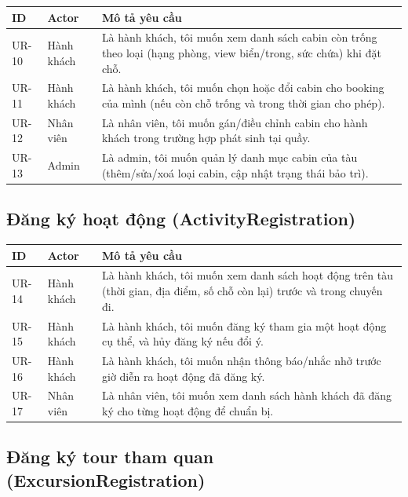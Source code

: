 \documentclass[a4paper,11pt]{article}
\begin{document}
\begin{longtable}{L{1.6cm} L{2.6cm} L{9.5cm}}
\toprule
\textbf{ID} & \textbf{Actor} & \textbf{Mô tả yêu cầu} \\
\midrule
\endhead
UR-10 & Hành khách & Là hành khách, tôi muốn xem danh sách cabin còn trống theo loại (hạng phòng, view biển/trong, sức chứa) khi đặt chỗ. \\
UR-11 & Hành khách & Là hành khách, tôi muốn chọn hoặc đổi cabin cho booking của mình (nếu còn chỗ trống và trong thời gian cho phép). \\
UR-12 & Nhân viên & Là nhân viên, tôi muốn gán/điều chỉnh cabin cho hành khách trong trường hợp phát sinh tại quầy. \\
UR-13 & Admin & Là admin, tôi muốn quản lý danh mục cabin của tàu (thêm/sửa/xoá loại cabin, cập nhật trạng thái bảo trì). \\
\bottomrule
\end{longtable}

\subsection{Đăng ký hoạt động (ActivityRegistration)}

\begin{longtable}{L{1.6cm} L{2.6cm} L{9.5cm}}
\toprule
\textbf{ID} & \textbf{Actor} & \textbf{Mô tả yêu cầu} \\
\midrule
\endhead
UR-14 & Hành khách & Là hành khách, tôi muốn xem danh sách hoạt động trên tàu (thời gian, địa điểm, số chỗ còn lại) trước và trong chuyến đi. \\
UR-15 & Hành khách & Là hành khách, tôi muốn đăng ký tham gia một hoạt động cụ thể, và hủy đăng ký nếu đổi ý. \\
UR-16 & Hành khách & Là hành khách, tôi muốn nhận thông báo/nhắc nhở trước giờ diễn ra hoạt động đã đăng ký. \\
UR-17 & Nhân viên & Là nhân viên, tôi muốn xem danh sách hành khách đã đăng ký cho từng hoạt động để chuẩn bị. \\
\bottomrule
\end{longtable}

\subsection{Đăng ký tour tham quan (ExcursionRegistration)}
\end{document}
